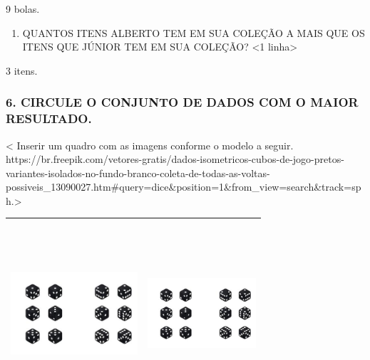 9 bolas.

\begin{enumerate}
\def\labelenumi{\Alph{enumi})}
\item
  QUANTOS ITENS ALBERTO TEM EM SUA COLEÇÃO A MAIS QUE OS ITENS QUE JÚNIOR TEM EM SUA COLEÇÃO?
  \textless{}1 linha\textgreater{}
\end{enumerate}

3 itens.

\subsubsection{6. CIRCULE O CONJUNTO DE DADOS COM O MAIOR
RESULTADO.}\label{circule-o-conjunto-de-dados-com-o-maior-resultado}

\textless{} Inserir um quadro com as imagens conforme o modelo a seguir.
https://br.freepik.com/vetores-gratis/dados-isometricos-cubos-de-jogo-pretos-variantes-isolados-no-fundo-branco-coleta-de-todas-as-voltas-possiveis\_13090027.htm\#query=dice\&position=1\&from\_view=search\&track=sph.\textgreater{}

\begin{longtable}[]{@{}ll@{}}
\toprule
\includegraphics[width=1.85846in,height=2.68750in]{media/image7.jpg} &
\includegraphics[width=1.57843in,height=2.68750in]{media/image7.jpg}\tabularnewline
\bottomrule
\end{longtable}

